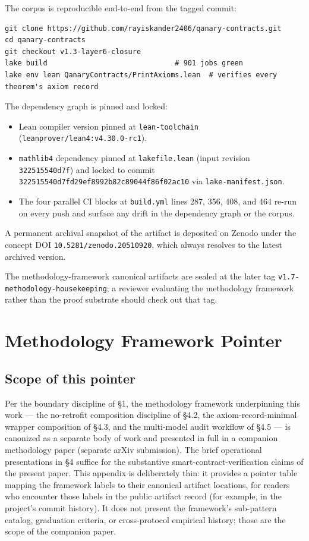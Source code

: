 The corpus is reproducible end-to-end from the tagged commit:

\begin{verbatim}
git clone https://github.com/rayiskander2406/qanary-contracts.git
cd qanary-contracts
git checkout v1.3-layer6-closure
lake build                              # 901 jobs green
lake env lean QanaryContracts/PrintAxioms.lean  # verifies every theorem's axiom record
\end{verbatim}

The dependency graph is pinned and locked:

\begin{itemize}
\tightlist
\item
  Lean compiler version pinned at \texttt{lean-toolchain}
  (\texttt{leanprover/lean4:v4.30.0-rc1}).
\item
  \texttt{mathlib4} dependency pinned at \texttt{lakefile.lean} (input
  revision \texttt{322515540d7f}) and locked to commit
  \texttt{322515540d7fd29ef8992b82c89044f86f02ac10} via
  \texttt{lake-manifest.json}.
\item
  The four parallel CI blocks at \texttt{build.yml} lines 287, 356, 408,
  and 464 re-run on every push and surface any drift in the dependency
  graph or the corpus.
\end{itemize}

A permanent archival snapshot of the artifact is deposited on Zenodo
under the concept DOI \texttt{10.5281/zenodo.20510920}, which always
resolves to the latest archived version.

The methodology-framework canonical artifacts are sealed at the later
tag \texttt{v1.7-methodology-housekeeping}; a reviewer evaluating the
methodology framework rather than the proof substrate should check out
that tag.

\section{Methodology Framework
Pointer}\label{methodology-framework-pointer}

\subsection{Scope of this pointer}\label{scope-of-this-pointer}

Per the boundary discipline of §1, the methodology framework
underpinning this work --- the no-retrofit composition discipline of
§4.2, the axiom-record-minimal wrapper composition of §4.3, and the
multi-model audit workflow of §4.5 --- is canonized as a separate body
of work and presented in full in a companion methodology paper (separate
arXiv submission). The brief operational presentations in §4 suffice for
the substantive smart-contract-verification claims of the present paper.
This appendix is deliberately thin: it provides a pointer table mapping
the framework labels to their canonical artifact locations, for readers
who encounter those labels in the public artifact record (for example,
in the project's commit history). It does not present the framework's
sub-pattern catalog, graduation criteria, or cross-protocol empirical
history; those are the scope of the companion paper.


